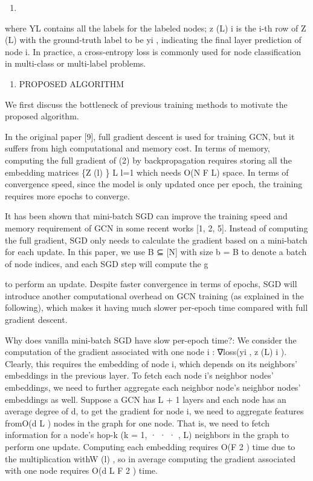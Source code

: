 \documentclass[
]{book}
\providecommand{\tightlist}{%
  \setlength{\itemsep}{0pt}\setlength{\parskip}{0pt}}
\begin{document}
{{{\begin{enumerate}
\def\labelenumi{(\arabic{enumi})}
\setcounter{enumi}{1}
\tightlist
\item
\end{enumerate}

where YL contains all the labels for the labeled nodes; z (L) i is the i-th row of Z (L) with the ground-truth label to be yi , indicating the final layer prediction of node i. In practice, a cross-entropy loss is commonly used for node classification in multi-class or multi-label problems.

\begin{enumerate}
\def\labelenumi{\arabic{enumi}.}
\setcounter{enumi}{2}
\tightlist
\item
  PROPOSED ALGORITHM
\end{enumerate}

We first discuss the bottleneck of previous training methods to motivate the proposed algorithm.

In the original paper {[}9{]}, full gradient descent is used for training GCN, but it suffers from high computational and memory cost. In terms of memory, computing the full gradient of (2) by backpropagation requires storing all the embedding matrices \{Z (l) \} L l=1 which needs O(N F L) space. In terms of convergence speed, since the model is only updated once per epoch, the training requires more epochs to converge.

It has been shown that mini-batch SGD can improve the training speed and memory requirement of GCN in some recent works {[}1, 2, 5{]}. Instead of computing the full gradient, SGD only needs to calculate the gradient based on a mini-batch for each update. In this paper, we use B ⊆ {[}N{]} with size b = \textbar B\textbar{} to denote a batch of node indices, and each SGD step will compute the g

to perform an update. Despite faster convergence in terms of epochs, SGD will introduce another computational overhead on GCN training (as explained in the following), which makes it having much slower per-epoch time compared with full gradient descent.

Why does vanilla mini-batch SGD have slow per-epoch time?: We consider the computation of the gradient associated with one node i : ∇loss(yi , z (L) i ). Clearly, this requires the embedding of node i, which depends on its neighbors' embeddings in the previous layer. To fetch each node i's neighbor nodes' embeddings, we need to further aggregate each neighbor node's neighbor nodes' embeddings as well. Suppose a GCN has L + 1 layers and each node has an average degree of d, to get the gradient for node i, we need to aggregate features fromO(d L ) nodes in the graph for one node. That is, we need to fetch information for a node's hop-k (k = 1, · · · , L) neighbors in the graph to perform one update. Computing each embedding requires O(F 2 ) time due to the multiplication withW (l) , so in average computing the gradient associated with one node requires O(d L F 2 ) time.

}}}
\end{document}

